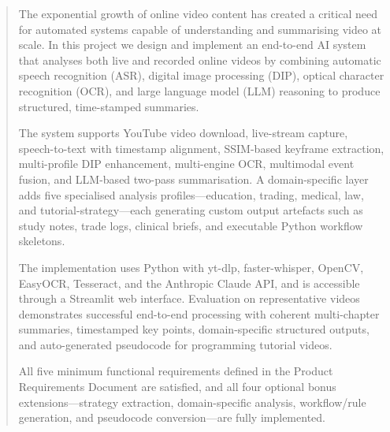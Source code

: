 \documentclass[12pt,a4paper]{article}
\begin{document}
\newpage
\begin{abstract}
\noindent
The exponential growth of online video content has created a critical need for automated
systems capable of understanding and summarising video at scale. In this project we
design and implement an end-to-end AI system that analyses both live and recorded online
videos by combining automatic speech recognition (ASR), digital image processing (DIP),
optical character recognition (OCR), and large language model (LLM) reasoning to produce
structured, time-stamped summaries.

The system supports YouTube video download, live-stream capture, speech-to-text with
timestamp alignment, SSIM-based keyframe extraction, multi-profile DIP enhancement,
multi-engine OCR, multimodal event fusion, and LLM-based two-pass summarisation.
A domain-specific layer adds five specialised analysis profiles—education, trading,
medical, law, and tutorial-strategy—each generating custom output artefacts such as
study notes, trade logs, clinical briefs, and executable Python workflow skeletons.

The implementation uses Python with yt-dlp, faster-whisper, OpenCV, EasyOCR, Tesseract,
and the Anthropic Claude API, and is accessible through a Streamlit web interface.
Evaluation on representative videos demonstrates successful end-to-end processing with
coherent multi-chapter summaries, timestamped key points, domain-specific structured
outputs, and auto-generated pseudocode for programming tutorial videos.

All five minimum functional requirements defined in the Product Requirements Document
are satisfied, and all four optional bonus extensions—strategy extraction, domain-specific
analysis, workflow/rule generation, and pseudocode conversion—are fully implemented.
\end{abstract}

\newpage
\tableofcontents

\newpage
\end{document}
